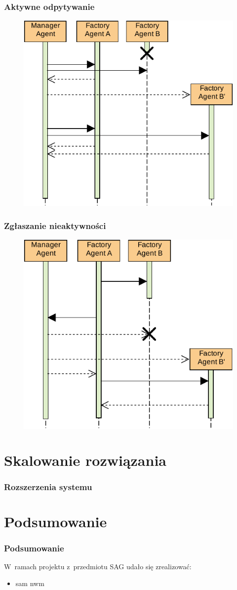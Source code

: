 \documentclass{beamer}
\begin{document}
\begin{frame}
    \frametitle{Aktywne odpytywanie}
    \begin{figure}
        \centering
        \includegraphics[width=0.65\columnwidth]{figures/SAG-Pingowanie.pdf}
        \label{fig:factory-fsm}
    \end{figure}
\end{frame}

\begin{frame}
    \frametitle{Zgłaszanie nieaktywności}
    \begin{figure}
        \centering
        \includegraphics[width=0.65\columnwidth]{figures/SAG-Kablowanie.pdf}
        \label{fig:factory-fsm}
    \end{figure}
\end{frame}

\section{Skalowanie rozwiązania}
\begin{frame}
    \frametitle{Rozszerzenia systemu}

\end{frame}

\section{Podsumowanie}
\begin{frame}
    \frametitle{Podsumowanie}
    W~ramach projektu z~przedmiotu SAG udało się zrealizować:
    \begin{itemize}
        \item sam nwm
    \end{itemize}
\end{frame}
\end{document}
